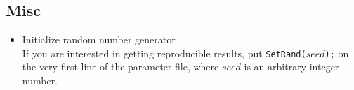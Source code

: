 \documentclass[11pt]{article}
\begin{document}
\subsection{Misc}
\begin{itemize}
\item{Initialize random number generator} \hfill \\
If you are interested in getting reproducible results, put \texttt{SetRand(}$seed$\texttt{);} on the very first line of the parameter file, where $seed$ is an arbitrary integer number.
\end{itemize}



\end{document}
